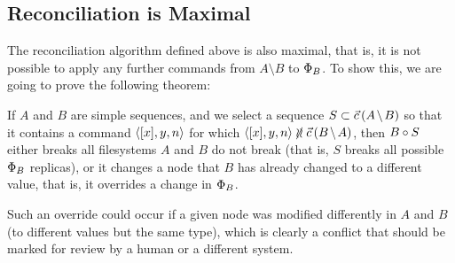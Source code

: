 
\subsection{Reconciliation is Maximal}



The reconciliation algorithm defined above is also maximal, that is,
it is not possible to apply any further commands from $A\setminus B$ to $\Phi_B$.
To show this, we are going to prove the following theorem:

\begin{myth}
If $A$ and $B$ are simple sequences,
and we select a sequence $S\subset \amb$ so that
it contains a command $\langle{[x],y,n}\rangle$ for which $\cxynv\nindep\bma$,
then $B\circ S$ either breaks all filesystems $A$ and $B$ do not break
(that is, $S$ breaks all possible $\Phi_B$ replicas),
or it changes a node that $B$ has already changed to a different value,
that is, it overrides a change in $\Phi_B$.
\end{myth}
Such an override could occur if a given node was modified differently in
$A$ and $B$ (to different values but the same type), which is clearly
a conflict that should be marked for review
by a human or a different system.
